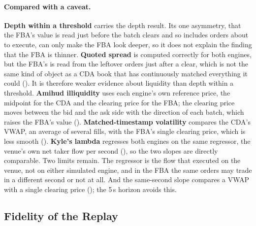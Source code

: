 \paragraph{Compared with a caveat.} \textbf{Depth within a threshold}
carries the depth result. Its one asymmetry, that the FBA's value is read
just before the batch clears and so includes orders about to execute, can
only make the FBA look deeper, so it does not explain the finding that
the FBA is thinner. \textbf{Quoted spread} is computed correctly for both
engines, but the FBA's is read from the leftover orders just after a
clear, which is not the same kind of object as a CDA book that has
continuously matched everything it could ().
It is therefore weaker evidence about liquidity than depth within a
threshold. \textbf{Amihud illiquidity} uses each engine's own reference
price, the midpoint for the CDA and the clearing price for the FBA; the
clearing price moves between the bid and the ask side with the direction
of each batch, which raises the FBA's value ().
\textbf{Matched-timestamp volatility} compares the CDA's VWAP, an average
of several fills, with the FBA's single clearing price, which is less
smooth (). \textbf{Kyle's lambda} regresses both engines on the same
regressor, the venue's own net taker flow per second
(), so the two slopes are directly comparable. Two
limits remain. The regressor is the flow that executed on the venue, not
on either simulated engine, and in the FBA the same orders may trade in a
different second or not at all. And the same-second slope compares a VWAP
with a single clearing price (); the 5\,s horizon avoids
this.

\subsection{Fidelity of the Replay}
\label{sec:limitsreplay}


